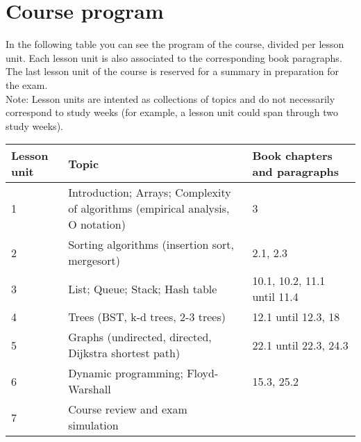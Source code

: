 \section{Course program}
	
	In the following table you can see the program of the course, divided per lesson unit. Each lesson unit is also associated to the corresponding book paragraphs. The last lesson unit of the course is reserved for a summary in preparation for the exam. \\
	Note: Lesson units are intented as collections of topics and do not necessarily correspond to study weeks (for example, a lesson unit could span through two study weeks).
	
	\begin{tabular}{ | p{1.2cm} | p{10cm} | p{3.7cm} | }
		\hline
	  	\textbf{Lesson unit} & \textbf{Topic} & \textbf{Book chapters and paragraphs} \\
	  	\hline
  		1 & Introduction; Arrays; Complexity of algorithms (empirical analysis, O notation) & 3 \\
  		\hline
  		2 & Sorting algorithms (insertion sort, mergesort) & 2.1, 2.3 \\
  		\hline
  		3 & List; Queue; Stack; Hash table &  10.1, 10.2, 11.1 until 11.4 \\
  		\hline
  		4 & Trees (BST, k-d trees, 2-3 trees) & 12.1 until 12.3, 18 \\
  		\hline
  		5 & Graphs (undirected, directed, Dijkstra shortest path) & 22.1 until 22.3, 24.3 \\
  		\hline
  		6 & Dynamic programming; Floyd-Warshall & 15.3, 25.2\\
  		\hline
  		7 & Course review and exam simulation & \\
  		\hline
	\end{tabular}
\begin{comment}
  		4 & Binary search trees & 3.2 \\
  		\hline
  		5 & Balanced search trees: 2-3 search trees & 3.3 \\
  		\hline
  		6 & Graphs (undirected; directed; Dijkstra shortest path) & 4.1, 4.2, 4.4 \\
  		\hline
  		7 & Dynamic programming; Floyd-Warshall & Not covered by the book, see slides or Cormen\\
  		\hline
  		8 & Course recap & \\
  		\hline
\end{comment}
